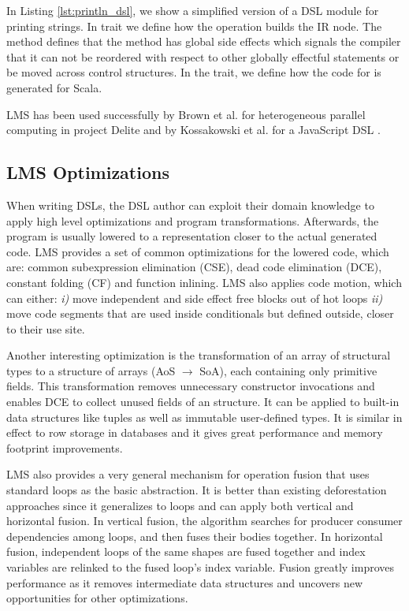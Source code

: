  
In Listing \ref{lst:println_dsl}, we show a simplified version of a DSL module
for printing strings. In trait  we define how the
 operation builds the IR node. The  method
defines that the  method has global side effects which signals the
compiler that it can not be reordered with respect to other globally effectful
statements or be moved across control structures. In the 
trait, we define how the code for  is generated for Scala.

LMS has been used successfully by Brown et al. for heterogeneous parallel
computing in project Delite \cite{brown_heterogeneous_2011, dsl11} and by
Kossakowski et al. for a JavaScript DSL \cite{greg}.

\subsection{LMS Optimizations}
\label{subsec:lms-optimizations}
When writing DSLs, the DSL author can exploit their domain knowledge to apply
high level optimizations and program transformations. Afterwards, the program is
usually lowered to a representation closer to the actual generated code. LMS
provides a set of common optimizations for the lowered code, which are: common
subexpression elimination (CSE), dead code elimination (DCE), constant folding
(CF) and function inlining. LMS also applies code motion, which can either:
\emph{i)} move independent and side effect free blocks out of hot loops
\emph{ii)} move code segments that are used inside conditionals but defined
outside, closer to their use site.

Another interesting optimization is the transformation of an array of structural
types to a structure of arrays (AoS $\rightarrow$ SoA), each containing only
primitive fields. This transformation removes unnecessary constructor
invocations and enables DCE to collect unused fields of an structure. It can be
applied to built-in data structures like tuples as well as immutable
user-defined types. It is similar in effect to row storage in databases and it
gives great performance and memory footprint improvements.

LMS also provides a very general mechanism for operation fusion that uses
standard loops as the basic abstraction. It is better than existing
deforestation approaches since it generalizes to loops and can apply both
vertical and horizontal fusion. In vertical fusion, the algorithm searches for
producer consumer dependencies among loops, and then fuses their bodies
together. In horizontal fusion, independent loops of the same shapes are fused
together and index variables are relinked to the fused loop's index variable.
Fusion greatly improves performance as it removes intermediate data structures
and uncovers new opportunities for other optimizations.

